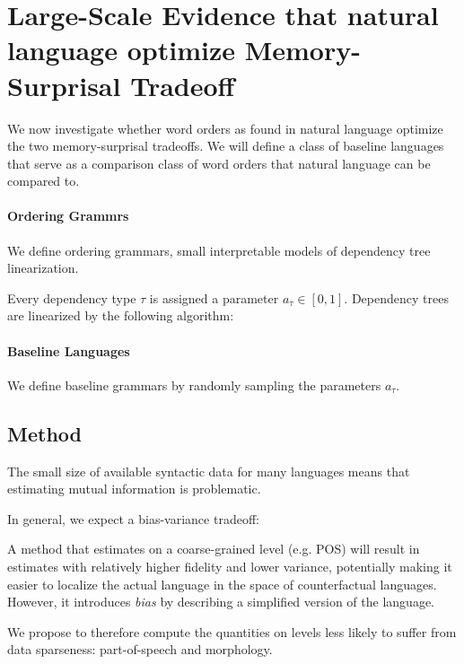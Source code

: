 \documentclass[11pt,letterpaper]{article}
\begin{document}
\section{Large-Scale Evidence that natural language optimize Memory-Surprisal Tradeoff}

We now investigate whether word orders as found in natural language optimize the two memory-surprisal tradeoffs.
We will define a class of baseline languages that serve as a comparison class of word orders that natural language can be compared to.



\paragraph{Ordering Grammrs}
We define ordering grammars, small interpretable models of dependency tree linearization.

Every dependency type $\tau$ is assigned a parameter $a_\tau \in [0,1]$.
Dependency trees are linearized by the following algorithm:




\paragraph{Baseline Languages}
We define baseline grammars by randomly sampling the parameters $a_\tau$.




\subsection{Method}
The small size of available syntactic data for many languages means that estimating mutual information is problematic.


In general, we expect a bias-variance tradeoff:

A method that estimates on a coarse-grained level (e.g. POS) will result in estimates with relatively higher fidelity and lower variance, potentially making it easier to localize the actual language in the space of counterfactual languages.
However, it introduces \emph{bias} by describing a simplified version of the language.





We propose to therefore compute the quantities on levels less likely to suffer from data sparseness: part-of-speech and morphology.
\end{document}
